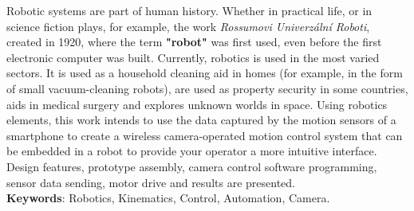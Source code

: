 
\begin{resumo}[ABSTRACT]
\begin{SingleSpacing}


Robotic systems are part of human history. Whether in practical life, or in science fiction plays, for example, the work \emph{Rossumovi Univerzální Roboti}, created in 1920, where the term \textbf{"robot"} was first used, even before the first electronic computer was built.
Currently, robotics is used in the most varied sectors. It is used as a household cleaning aid in homes (for example, in the form of small vacuum-cleaning robots), are used as property security in some countries, aids in medical surgery and explores unknown worlds in space. Using robotics elements, this work intends to use the data captured by the motion sensors of a smartphone to create a wireless camera-operated motion control system that can be embedded in a robot to provide your operator a more intuitive interface. Design features, prototype assembly, camera control software programming, sensor data sending, motor drive and results are presented.\\

\textbf{Keywords}: Robotics, Kinematics, Control, Automation, Camera.

\end{SingleSpacing}
\end{resumo}


